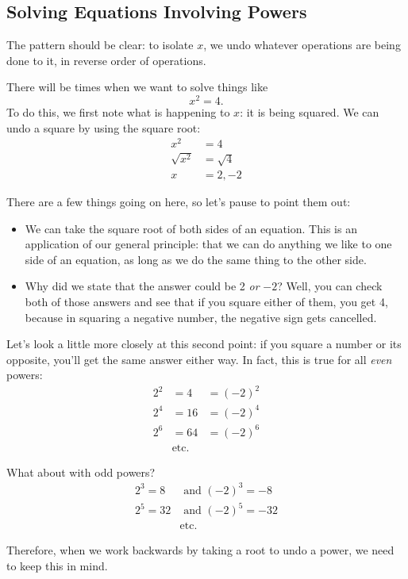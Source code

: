 \subsection{Solving Equations Involving Powers}
The pattern should be clear: to isolate $x$, we undo whatever operations are being done to it, in reverse order of operations.

There will be times when we want to solve things like \[x^2=4.\]  To do this, we first note what is happening to $x$: it is being squared.  We can undo a square by using the square root:
\begin{align*}
x^2 &= 4\\
\sqrt{x^2} &= \sqrt{4}\\
x &= 2,-2
\end{align*}

There are a few things going on here, so let's pause to point them out:
\begin{itemize}
\item We can take the square root of both sides of an equation.  This is an application of our general principle: that we can do anything we like to one side of an equation, as long as we do the same thing to the other side.
\item Why did we state that the answer could be 2 \emph{or} $-2$?  Well, you can check both of those answers and see that if you square either of them, you get 4, because in squaring a negative number, the negative sign gets cancelled.
\end{itemize}

Let's look a little more closely at this second point: if you square a number or its opposite, you'll get the same answer either way.  In fact, this is true for all \emph{even} powers:
\begin{align*}
2^2 &= 4 &= (-2)^2\\
2^4 &= 16 &= (-2)^4\\
2^6 &= 64 &= (-2)^6\\
&\textrm{etc.}
\end{align*}

What about with odd powers?
\begin{align*}
2^3 = 8 &\textrm{ and } (-2)^3 = -8\\
2^5 = 32 &\textrm{ and } (-2)^5 = -32\\
&\textrm{etc.}
\end{align*}

Therefore, when we work backwards by taking a root to undo a power, we need to keep this in mind.

